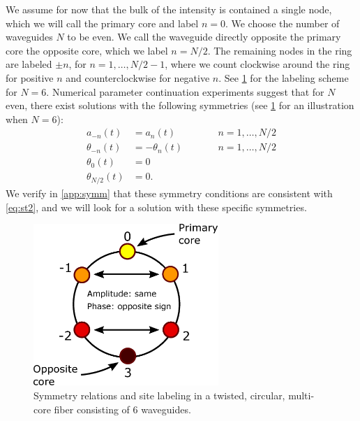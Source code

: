 \documentclass[11pt,reqno]{amsart}
\begin{document}
We assume for now that the bulk of the intensity is contained a single node, which we will call the primary core and label $n=0$. We choose the number of waveguides $N$ to be even. We call the waveguide directly opposite the primary core the opposite core, which we label $n=N/2$. The remaining nodes in the ring are labeled $\pm n$, for $n = 1, \dots, N/2-1$, where we count clockwise around the ring for positive $n$ and counterclockwise for negative $n$. See \cref{fig:symm6} for the labeling scheme for $N=6$. Numerical parameter continuation experiments suggest that for $N$ even, there exist solutions with the following symmetries (see \cref{fig:symm6} for an illustration when $N=6$):
\begin{equation}\label{eq:symm}
\begin{aligned}
a_{-n}(t) &= a_{n}(t) && \qquad n = 1, \dots, N/2 \\
\theta_{-n}(t) &= -\theta_{n}(t) && \qquad n = 1, \dots, N/2 \\
\theta_0(t) &= 0 \\
\theta_{N/2}(t) &= 0.
\end{aligned}
\end{equation} 
We verify in \cref{app:symm} that these symmetry conditions are consistent with \cref{eq:st2}, and we will look for a solution with these specific symmetries. 

\begin{figure}
\begin{center}
\includegraphics[width=7cm]{symm6}
\end{center}
\caption{Symmetry relations and site labeling in a twisted, circular, multi-core fiber consisting of 6 waveguides.}
\label{fig:symm6}
\end{figure}
\end{document}

